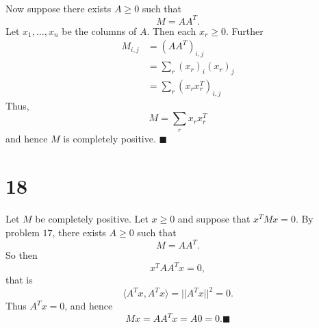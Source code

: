 \documentclass[letterpaper,12pt,oneside,onecolumn]{article}
\newcommand{\1}{\mathbbm{1}}
\begin{document}
\paragraph{}
Now suppose there exists $A \geq 0$ such that $$M = AA^T.$$
Let $x_1, \dots, x_n$ be the columns of $A$.  Then each $x_r \geq 0$. Further
\begin{align*}
M_{i,j} &= (AA^T)_{i,j} \\
&=  \sum_r (x_r)_i (x_r)_j \\
&= \sum_r(x_r x_r^T)_{i,j} 
\end{align*}
Thus,
$$M = \sum_r x_r x_r^T$$
and hence $M$ is completely positive. $\blacksquare$
\section*{18}
\paragraph{}
Let $M$ be completely positive. Let $x \geq 0$ and suppose that $x^TMx = 0$. By problem $17$, there exists $A \geq 0$ such that
$$ M = AA^T.$$
So then 
$$x^TAA^Tx = 0,$$
that is
$$\langle A^Tx, A^Tx \rangle = ||A^Tx||^2 = 0.$$
Thus $A^Tx = 0$, and hence
$$Mx = AA^Tx = A0 = 0.\blacksquare$$
\end{document}
